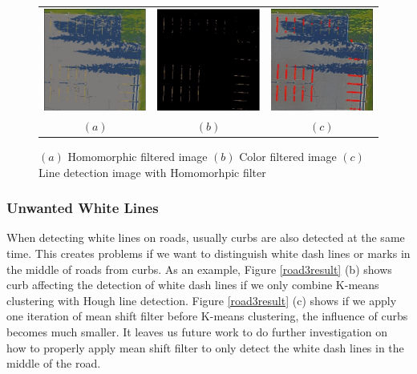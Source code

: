 \documentclass{m2pi}
\begin{document}
\begin{figure}[htp]
\centering
\begin{tabular}{ccc}
\includegraphics[width = 3.8cm]{figures/Transformed_Homomorphic_Lot11.jpg}&
\includegraphics[width = 3.8cm]{figures/Masked_Homomorphic_Lot11.jpg}&
\includegraphics[width= 3.8cm]{figures/line_detected_Homomorphic_Lot11.jpg}\\
$(a)$ & $(b)$ & $(c)$
\end{tabular}
\caption{$(a)$ Homomorphic filtered image $(b)$ Color filtered image $(c)$ Line detection image with Homomorhpic filter}
\label{homo_transformed}
\end{figure}

\subsubsection{Unwanted White Lines}



When detecting white lines on roads, usually curbs are also detected at the same time. This creates problems if we want to distinguish white dash lines or marks in the middle of roads from curbs. As an example, Figure \ref{road3result} (b) shows curb affecting the detection of white dash lines if we only combine K-means clustering with Hough line detection.  Figure \ref{road3result} (c) shows if we apply one iteration of mean shift filter before K-means clustering, the influence of curbs becomes much smaller. 
It leaves us future work to do further investigation on how to properly apply 
mean shift filter to only detect the white dash lines in the middle of the 
road.
\end{document}
